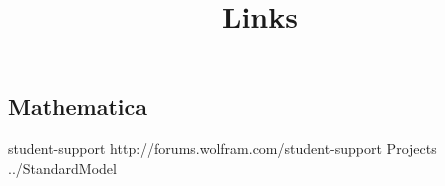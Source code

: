 \documentclass{report}
\begin{document}

\title{ Links 
}
\author{}
\date{}
\maketitle
\subsection { Mathematica }
\htmladdnormallink
{student-support
}{http://forums.wolfram.com/student-support
}
\linebreak
\htmladdnormallink
{Projects
}{../StandardModel
}
\linebreak
\clearpage
\end{document}
